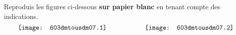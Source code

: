 Reproduis les figures ci-dessous {\bf sur papier blanc} en tenant
compte des indications.
\[\texttt{[image: 603dmtousdm07.1]}\kern2cm
\texttt{[image: 603dmtousdm07.2]}\]